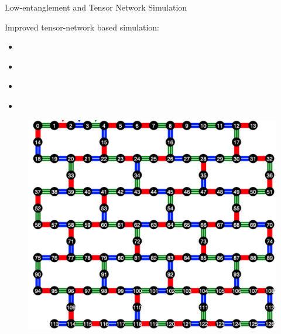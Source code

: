 \documentclass[10pt]{beamer}
\begin{document}
\begin{CJK}{UTF8}{gbsn}
\begin{frame}[fragile]{Low-entanglement and Tensor Network Simulation}
  
   \begin{minipage}{0.5\textwidth}
    Improved tensor-network based simulation:
     \begin{itemize}
       \item \cite{tindall2023efficient} 
       \item \cite{beguvsic2024fast}
       \item \cite{liao2023simulation}
       \item \cite{patra2024efficient}
     \end{itemize}
   \end{minipage}
   \hfill
   \begin{minipage}{0.45\textwidth}
  \begin{figure}
    \centering
       \includegraphics[width=\textwidth]{fig/ibm3.jpg}
  \end{figure}
   \end{minipage}
 
\end{frame}
\end{CJK}
\end{document}
